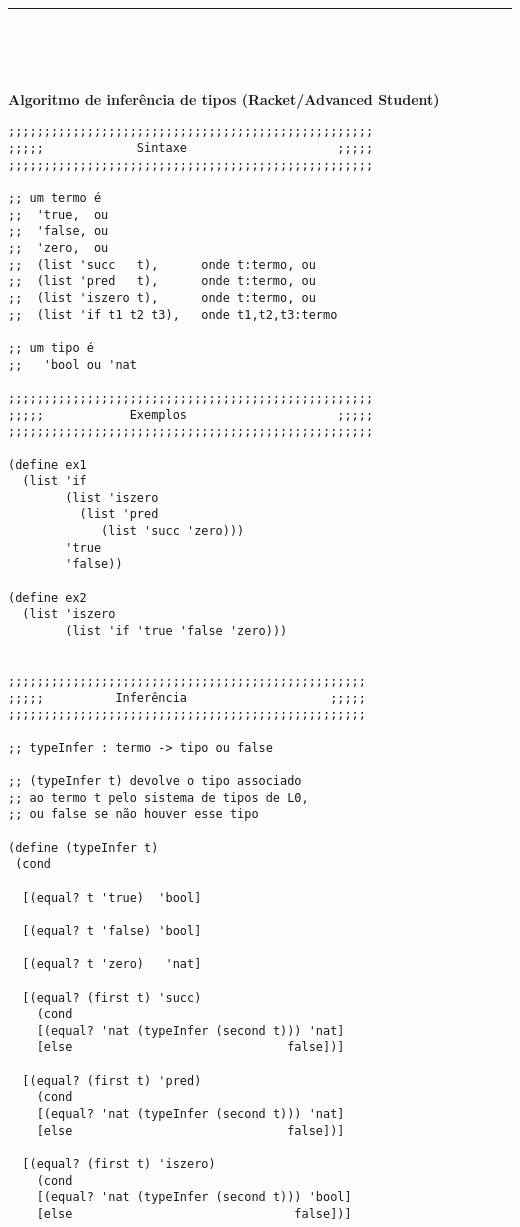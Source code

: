 \documentclass[10pt,a4paper]{article}
\begin{document}
\ 

\hrule 

\ 

\ 

\noindent \textbf{Algoritmo de inferência de tipos (Racket/Advanced Student)}


\begin{multicols}{2}

\begin{verbatim}
;;;;;;;;;;;;;;;;;;;;;;;;;;;;;;;;;;;;;;;;;;;;;;;;;;; 
;;;;;             Sintaxe                     ;;;;;
;;;;;;;;;;;;;;;;;;;;;;;;;;;;;;;;;;;;;;;;;;;;;;;;;;;

;; um termo é 
;;  'true,  ou 
;;  'false, ou
;;  'zero,  ou 
;;  (list 'succ   t),      onde t:termo, ou
;;  (list 'pred   t),      onde t:termo, ou
;;  (list 'iszero t),      onde t:termo, ou
;;  (list 'if t1 t2 t3),   onde t1,t2,t3:termo

;; um tipo é
;;   'bool ou 'nat

;;;;;;;;;;;;;;;;;;;;;;;;;;;;;;;;;;;;;;;;;;;;;;;;;;; 
;;;;;            Exemplos                     ;;;;;
;;;;;;;;;;;;;;;;;;;;;;;;;;;;;;;;;;;;;;;;;;;;;;;;;;;

(define ex1
  (list 'if 
        (list 'iszero 
          (list 'pred 
             (list 'succ 'zero)))
        'true
        'false))

(define ex2
  (list 'iszero 
        (list 'if 'true 'false 'zero)))


;;;;;;;;;;;;;;;;;;;;;;;;;;;;;;;;;;;;;;;;;;;;;;;;;; 
;;;;;          Inferência                    ;;;;;
;;;;;;;;;;;;;;;;;;;;;;;;;;;;;;;;;;;;;;;;;;;;;;;;;;

;; typeInfer : termo -> tipo ou false

;; (typeInfer t) devolve o tipo associado 
;; ao termo t pelo sistema de tipos de L0, 
;; ou false se não houver esse tipo

(define (typeInfer t)
 (cond

  [(equal? t 'true)  'bool]

  [(equal? t 'false) 'bool]

  [(equal? t 'zero)   'nat]

  [(equal? (first t) 'succ) 
    (cond 
    [(equal? 'nat (typeInfer (second t))) 'nat]
    [else                              false])]

  [(equal? (first t) 'pred) 
    (cond 
    [(equal? 'nat (typeInfer (second t))) 'nat]
    [else                              false])]

  [(equal? (first t) 'iszero) 
    (cond 
    [(equal? 'nat (typeInfer (second t))) 'bool]
    [else                               false])]


\end{verbatim}
\end{multicols}
\end{document}
